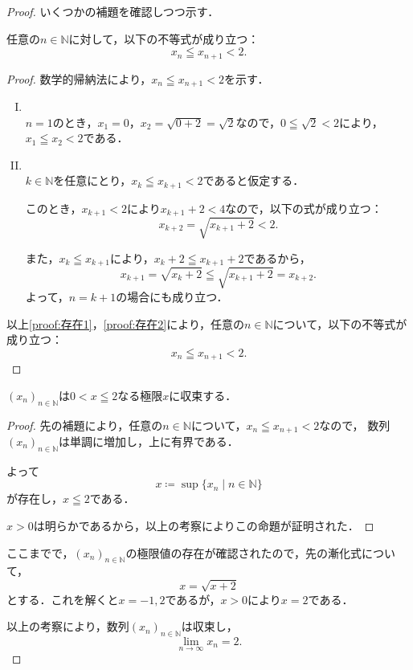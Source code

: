 \begin{tleftbar}
  \begin{proof}
    いくつかの補題を確認しつつ示す．
    \begin{lemma}{}{}
      任意の$n \in \mathbb{N}$に対して，以下の不等式が成り立つ：
      \[
        x_n \leqq x_{n+1} < 2.
      \]
    \end{lemma}
      \begin{proof}
        数学的帰納法により，$x_n \leqq x_{n+1} < 2$を示す．
        \begin{enumerate}[(I)]
          \item \mbox{} \\ \label{proof:存在1}
                $n=1$のとき，$ x_1 =0$，$x_2= \sqrt{0+2}=\sqrt{2}$なので，$ 0 \leqq \sqrt{2} < 2$により，
                $x_1 \leqq x_2 < 2$である．
          \item \mbox{} \\ \label{proof:存在2}
                $k \in \mathbb{N}$を任意にとり，$x_k \leqq x_{k+1} < 2$であると仮定する．

                このとき，$x_{k+1} < 2$により$ x_{k+1}+2 < 4$なので，以下の式が成り立つ：
                \[
                  x_{k+2}=\sqrt{x_{k+1} + 2} < 2.
                \]

                また，$x_k \leqq x_{k+1}$により，$x_k +2  \leqq x_{k+1}+2$であるから，
                \[
                  x_{k+1}= \sqrt{x_k +2} \leqq \sqrt{x_{k+1}+2}=x_{k+2}.
                \]
                よって，$n=k+1$の場合にも成り立つ．
        \end{enumerate}
        以上\ref{proof:存在1}，\ref{proof:存在2}により，任意の$n \in \mathbb{N}$について，以下の不等式が成り立つ：
        \[
          x_n \leqq x_{n+1} < 2.
        \]
      \end{proof}
    \begin{lemma}{}{}
      $(x_n)_{n \in \mathbb{N}}$は$ 0<  x \leqq 2$なる極限$x$に収束する．
    \end{lemma}
      \begin{proof}
        先の補題により，任意の$n \in \mathbb{N}$について，$ x_n \leqq x_{n+1} <2$なので，
        数列$(x_n)_{n \in \mathbb{N}}$は単調に増加し，上に有界である．

        よって
        \[
          x \coloneqq \sup \{ x_n \mid n \in \mathbb{N} \}
        \]
        が存在し，$x \leqq  2$である．

        $ x>0$は明らかであるから，以上の考察によりこの命題が証明された．
      \end{proof}

    ここまでで，$(x_n)_{n \in \mathbb{N}}$の極限値の存在が確認されたので，先の漸化式について，
    \[
      x=\sqrt{x+2}
    \]
    とする．これを解くと$ x= -1,2$であるが，$x>0$により$x=2$である．

    以上の考察により，数列$(x_n)_{n \in \mathbb{N}}$は収束し，
    \[
      \lim_{n \to \infty} x_n =2.
    \]
  \end{proof}
\end{tleftbar}

